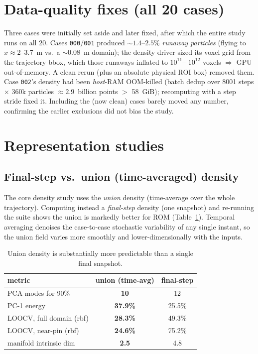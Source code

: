 \documentclass[11pt]{article}
\begin{document}
\section{Data-quality fixes (all 20 cases)}\label{sec:rerun}
Three cases were initially set aside and later fixed, after which the
entire study runs on all 20. Cases \texttt{000}/\texttt{001} produced
${\sim}1.4$--$2.5\%$ \emph{runaway particles} (flying to $x\approx2$--3.7~m
vs.\ a ${\sim}0.08$~m domain); the density driver sized its voxel grid
from the trajectory bbox, which those runaways inflated to $10^{11}$--
$10^{12}$ voxels $\Rightarrow$ GPU out-of-memory. A clean rerun (plus an
absolute physical ROI box) removed them. Case \texttt{002}'s density had
been \emph{host}-RAM OOM-killed (batch dedup over 8001 steps $\times$ 360k
particles $\approx2.9$~billion points $>$ 58~GiB); recomputing with a step
stride fixed it. Including the (now clean) cases barely moved any number,
confirming the earlier exclusions did not bias the study.

\section{Representation studies}

\subsection{Final-step vs.\ union (time-averaged) density}
The core density study uses the \emph{union} density (time-average over
the whole trajectory). Computing instead a \emph{final-step} density (one
snapshot) and re-running the suite shows the union is markedly better for
ROM (Table~\ref{tab:finalstep}). Temporal averaging denoises the
case-to-case stochastic variability of any single instant, so the union
field varies more smoothly and lower-dimensionally with the inputs.

\begin{table}[H]\centering
\begin{tabular}{lcc}
\toprule
metric & union (time-avg) & final-step \\
\midrule
PCA modes for 90\% & \textbf{10} & 12 \\
PC-1 energy & \textbf{37.9\%} & 25.5\% \\
LOOCV, full domain (rbf) & \textbf{28.3\%} & 49.3\% \\
LOOCV, near-pin (rbf) & \textbf{24.6\%} & 75.2\% \\
manifold intrinsic dim & \textbf{2.5} & 4.8 \\
\bottomrule
\end{tabular}
\caption{Union density is substantially more predictable than a single
final snapshot.}\label{tab:finalstep}
\end{table}
\end{document}
